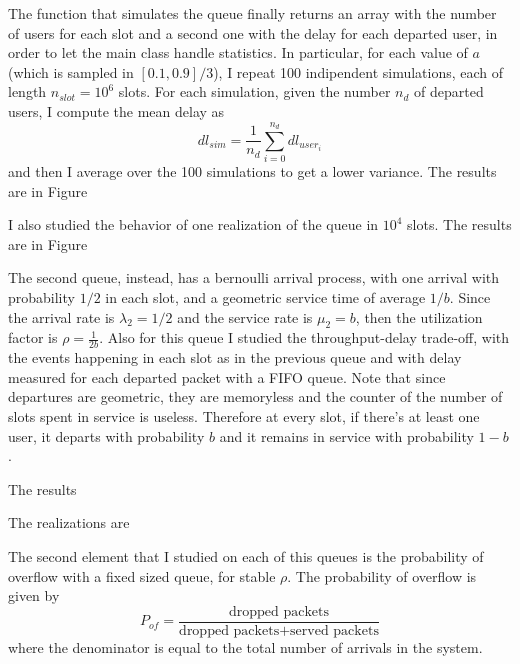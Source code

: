 \documentclass[10pt]{article}
\begin{document}
The function that simulates the queue finally returns an array with the number of users for each slot and a second one with the delay for each departed user, in order to let the main class handle statistics. In particular, for each value of $a$ (which is sampled in $[0.1, 0.9]/3$), I repeat 100 indipendent simulations, each of length $n_{slot} = 10^6$ slots. For each simulation, given the number $n_{d}$ of departed users, I compute the mean delay as 
\begin{equation}
  dl_{sim} = \frac{1}{n_d} \sum_{i = 0}^{n_d} dl_{user_i}
\end{equation}
and then I average over the 100 simulations to get a lower variance. The results are in Figure

I also studied the behavior of one realization of the queue in $10^4$ slots. The results are in Figure

The second queue, instead, has a bernoulli arrival process, with one arrival with probability $1/2$ in each slot, and a geometric service time of average $1/b$. Since the arrival rate is $\lambda_2 = 1/2$ and the service rate is $\mu_2 = b$, then the utilization factor is $\rho = \frac{1}{2b}$. Also for this queue I studied the throughput-delay trade-off, with the events happening in each slot as in the previous queue and with delay measured for each departed packet with a FIFO queue. Note that since departures are geometric, they are memoryless and the counter of the number of slots spent in service is useless. Therefore at every slot, if there's at least one user, it departs with probability $b$ and it remains in service with probability $1-b$. 

The results 

The realizations are

The second element that I studied on each of this queues is the probability of overflow with a fixed sized queue, for stable $\rho$. The probability of overflow is given by 
\begin{equation}
  P_{of} = \frac{\mbox{dropped packets}}{\mbox{dropped packets} + \mbox{served packets}}
\end{equation}
where the denominator is equal to the total number of arrivals in the system. 
\end{document}
